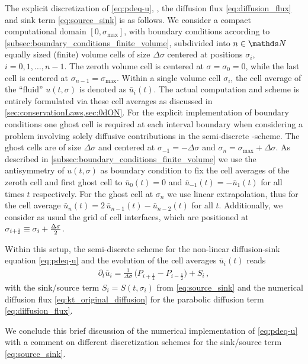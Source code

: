 The explicit discretization of \cref{eq:pdeq-u}, \ie{}, the diffusion flux \eqref{eq:diffusion_flux} and sink term \eqref{eq:source_sink} is as follows.
We consider a compact computational domain $[ 0, \sigma_\mathrm{max} ]$, with boundary conditions according to \cref{subsec:boundary_conditions_finite_volume}, subdivided into $n \in \Integers{}$ equally sized (finite) volume cells of size $\Delta \sigma$ centered at positions $\sigma_i$, $i = 0, 1, \ldots, n - 1$.
The zeroth volume cell is centered at ${\sigma = \sigma_0 = 0}$, while the last cell is centered at $\sigma_{n - 1} = \sigma_\mathrm{max}$.
Within a single volume cell $\sigma_i$, the cell average of the ``fluid'' $u ( t, \sigma)$ is denoted as $\bar{u}_i ( t )$.
The actual computation and scheme is entirely formulated via these cell averages as discussed in \cref{sec:conservationLaws,sec:0dON}.
For the explicit implementation of boundary conditions one ghost cell is required at each interval boundary when considering a problem involving solely diffusive contributions in the semi-discrete \kt{}-scheme.
The ghost cells are of size $\Delta \sigma$ and centered at $\sigma_{-1} = - \Delta \sigma$ and $\sigma_{n} = \sigma_\mathrm{max} + \Delta \sigma$.
As described in \cref{subsec:boundary_conditions_finite_volume} we use the antisymmetry of $u ( t, \sigma )$ as boundary condition to fix the cell averages of the zeroth cell and first ghost cell to $\bar{u}_0 ( t ) = 0$ and $\bar{u}_{-1} ( t ) = - \bar{u}_{1} ( t )$ for all times $t$ respectively.
For the ghost cell at $\sigma_n$ we use linear extrapolation, thus for the cell average $\bar{u}_{n} ( t ) = 2 \, \bar{u}_{n - 1} ( t ) - \bar{u}_{n - 2} ( t )$ for all $t$.
Additionally, we consider as usual the grid of cell interfaces, which are positioned at $\sigma_{i + \ttfrac{1}{2}} \equiv \sigma_i + \tfrac{\Delta \sigma}{2}$.
	
Within this setup, the semi-discrete scheme for the non-linear diffusion-sink equation \eqref{eq:pdeq-u} and the evolution of the cell averages $\bar{u}_i ( t )$ reads~\cite{KTO2-0}
\begin{align}
	\partial_t \bar{u}_i = \tfrac{1}{\Delta \sigma} \, \big( P_{i + \frac{1}{2}} - P_{i - \frac{1}{2}} \big) + S_i \, ,
\end{align}
with the sink/source term $S_i = S ( t, \sigma_i )$ from \cref{eq:source_sink} and the numerical diffusion flux \eqref{eq:kt_original_diffusion} for the parabolic \gnym{} diffusion term \eqref{eq:diffusion_flux}.\bigskip

We conclude this brief discussion of the numerical implementation of \cref{eq:pdeq-u} with a comment on different discretization schemes for the sink/source term \eqref{eq:source_sink}.\bigskip

